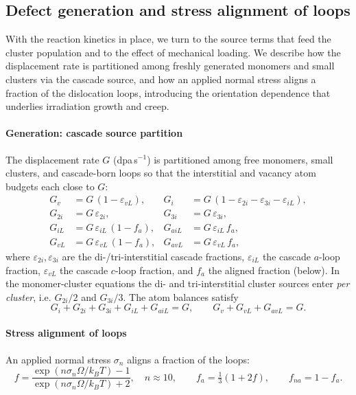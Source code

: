 \documentclass{article}
\begin{document}
\subsection{Defect generation and stress alignment of loops}
With the reaction kinetics in place, we turn to the source terms that feed the cluster population and to the effect of mechanical loading. We describe how the displacement rate is partitioned among freshly generated monomers and small clusters via the cascade source, and how an applied normal stress aligns a fraction of the dislocation loops, introducing the orientation dependence that underlies irradiation growth and creep.

\paragraph{Generation: cascade source partition}
The displacement rate $G$ (dpa\,s$^{-1}$) is partitioned among free monomers,
small clusters, and cascade-born loops so that the interstitial and vacancy
atom budgets each close to $G$:
\begin{align}
G_v   &= G\,(1-\varepsilon_{vL}), &
G_i   &= G\,(1-\varepsilon_{2i}-\varepsilon_{3i}-\varepsilon_{iL}),\\
G_{2i}&= G\,\varepsilon_{2i}, &
G_{3i}&= G\,\varepsilon_{3i},\\
G_{iL}&= G\,\varepsilon_{iL}\,(1-f_a), &
G_{aiL}&= G\,\varepsilon_{iL}\,f_a,\\
G_{vL}&= G\,\varepsilon_{vL}\,(1-f_a), &
G_{avL}&= G\,\varepsilon_{vL}\,f_a,
\end{align}
where $\varepsilon_{2i},\varepsilon_{3i}$ are the di-/tri-interstitial cascade
fractions, $\varepsilon_{iL}$ the cascade $a$-loop fraction, $\varepsilon_{vL}$
the cascade $c$-loop fraction, and $f_a$ the aligned fraction (below). In the
monomer-cluster equations the di- and tri-interstitial cluster sources enter
\emph{per cluster}, i.e. $G_{2i}/2$ and $G_{3i}/3$. The atom balances satisfy
\begin{equation}
G_i+G_{2i}+G_{3i}+G_{iL}+G_{aiL}=G,\qquad
G_v+G_{vL}+G_{avL}=G.
\end{equation}

\paragraph{Stress alignment of loops}
An applied normal stress $\sigma_n$ aligns a fraction of the loops:
\begin{equation}
f=\frac{\exp(n\sigma_n\Omega/k_BT)-1}{\exp(n\sigma_n\Omega/k_BT)+2},\quad n\approx10,
\qquad
f_a=\tfrac{1}{3}(1+2f),\qquad f_{na}=1-f_a.
\end{equation}
\end{document}
